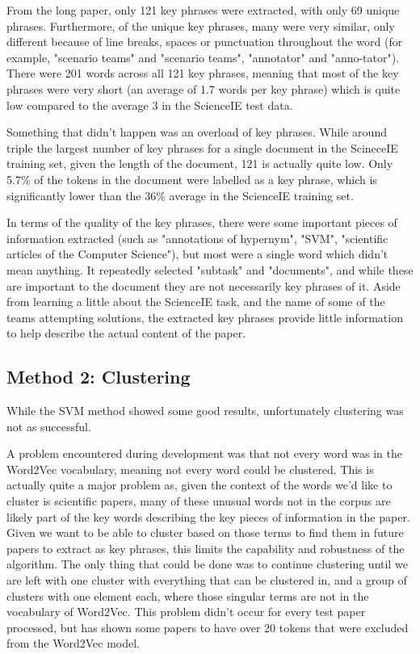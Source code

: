 From the long paper, only 121 key phrases were extracted, with only 69 unique phrases. Furthermore, of the unique key phrases, many were very similar, only different because of line breaks, spaces or punctuation throughout the word (for example, "scenario  teams" and "scenario teams", "annotator" and "anno-tator"). There were 201 words across all 121 key phrases, meaning that most of the key phrases were very short (an average of 1.7 words per key phrase) which is quite low compared to the average 3 in the ScienceIE test data. 

Something that didn't happen was an overload of key phrases. While around triple the largest number of key phrases for a single document in the ScineceIE training set, given the length of the document, 121 is actually quite low. Only 5.7\% of the tokens in the document were labelled as a key phrase, which is significantly lower than the 36\% average in the ScienceIE training set.

In terms of the quality of the key phrases, there were some important pieces of information extracted (such as "annotations of hypernym", "SVM", "scientific articles of the Computer Science"), but most were a single word which didn't mean anything. It repeatedly selected "subtask" and "documents", and while these are important to the document they are not necessarily key phrases of it. Aside from learning a little about the ScienceIE task, and the name of some of the teams attempting solutions, the extracted key phrases provide little information to help describe the actual content of the paper.

\subsection{Method 2: Clustering}
While the SVM method showed some good results, unfortunately clustering was not as successful. 

A problem encountered during development was that not every word was in the Word2Vec vocabulary, meaning not every word could be clustered. This is actually quite a major problem as, given the context of the words we'd like to cluster is scientific papers, many of these unusual words not in the corpus are likely part of the key words describing the key pieces of information in the paper. Given we want to be able to cluster based on those terms to find them in future papers to extract as key phrases, this limits the capability and robustness of the algorithm. The only thing that could be done was to continue clustering until we are left with one cluster with everything that can be clustered in, and a group of clusters with one element each, where those singular terms are not in the vocabulary of Word2Vec. This problem didn't occur for every test paper processed, but has shown some papers to have over 20 tokens that were excluded from the Word2Vec model. 

